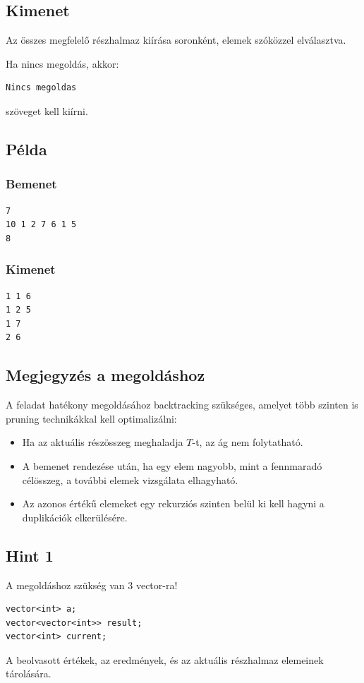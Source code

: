 \documentclass[12pt,a4paper]{article}
\begin{document}
\subsection*{Kimenet}

Az összes megfelelő részhalmaz kiírása soronként, elemek szóközzel elválasztva.

Ha nincs megoldás, akkor:
\begin{verbatim}
Nincs megoldas
\end{verbatim}
szöveget kell kiírni.

\subsection*{Példa}

\subsubsection*{Bemenet}
\begin{verbatim}
7
10 1 2 7 6 1 5
8
\end{verbatim}

\subsubsection*{Kimenet}
\begin{verbatim}
1 1 6
1 2 5
1 7
2 6
\end{verbatim}

\subsection*{Megjegyzés a megoldáshoz}

A feladat hatékony megoldásához backtracking szükséges, amelyet több szinten is pruning technikákkal kell optimalizálni:

\begin{itemize}
    \item Ha az aktuális részösszeg meghaladja $T$-t, az ág nem folytatható.
    \item A bemenet rendezése után, ha egy elem nagyobb, mint a fennmaradó célösszeg, a további elemek vizsgálata elhagyható.
    \item Az azonos értékű elemeket egy rekurziós szinten belül ki kell hagyni a duplikációk elkerülésére.
\end{itemize}

\subsection*{Hint 1}
A megoldáshoz szükség van 3 vector-ra!
\begin{verbatim}
vector<int> a;
vector<vector<int>> result;
vector<int> current;
\end{verbatim}
A beolvasott értékek, az eredmények, és az aktuális részhalmaz elemeinek tárolására.
\end{document}
